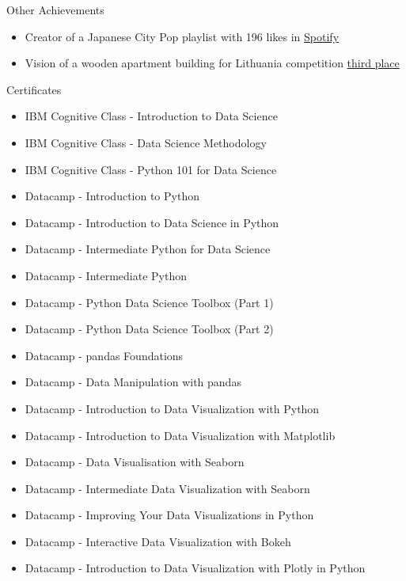 \documentclass{resume} %
\begin{document}

\newpage
\begin{rSection}{Other Achievements} 
\begin{itemize}
    \item	Creator of a Japanese City Pop playlist with 196 likes in \href{https://open.spotify.com/playlist/3nKlZGPp4gkTe9tHDAe41e?si=f38499d02e4b46c5}{Spotify}
    \item Vision of a wooden apartment building for Lithuania competition \href{https://open.spotify.com/playlist/3nKlZGPp4gkTe9tHDAe41e?si=f38499d02e4b46c5}{third place}

\end{itemize}


\end{rSection}

\begin{rSection}{Certificates} 
\begin{itemize}
    \item IBM Cognitive Class - Introduction to Data Science
    \item IBM Cognitive Class - Data Science Methodology
    \item IBM Cognitive Class - Python 101 for Data Science
    \item Datacamp - Introduction to Python
    \item Datacamp - Introduction to Data Science in Python
    \item Datacamp - Intermediate Python for Data Science
    \item Datacamp - Intermediate Python
    \item Datacamp - Python Data Science Toolbox (Part 1)
    \item Datacamp - Python Data Science Toolbox (Part 2)
    \item Datacamp - pandas Foundations
    \item Datacamp - Data Manipulation with pandas
    \item Datacamp - Introduction to Data Visualization with Python
    \item Datacamp - Introduction to Data Visualization with Matplotlib
    \item Datacamp - Data Visualisation with Seaborn
    \item Datacamp - Intermediate Data Visualization with Seaborn
    \item Datacamp - Improving Your Data Visualizations in Python
    \item Datacamp - Interactive Data Visualization with Bokeh
    \item Datacamp - Introduction to Data Visualization with Plotly in Python
\end{itemize}


\end{rSection}
\end{document}
